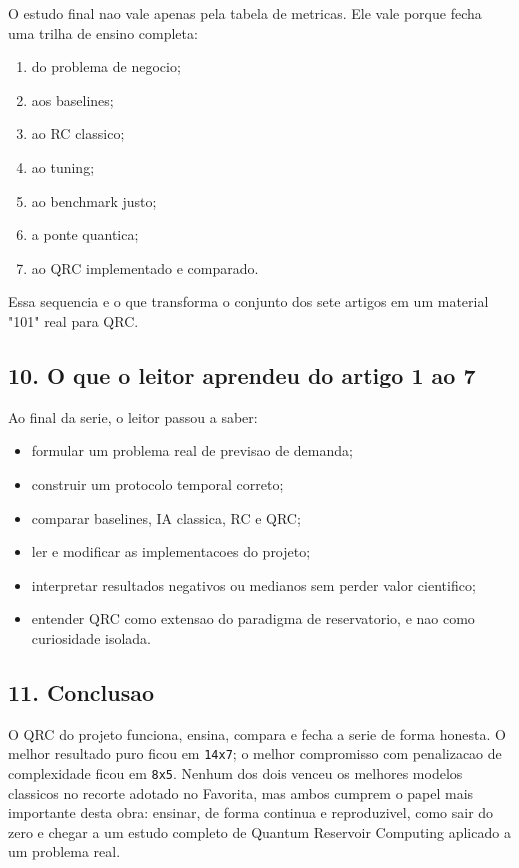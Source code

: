 \documentclass[12pt]{article}
\providecommand{\tightlist}{%
          \setlength{\itemsep}{0pt}\setlength{\parskip}{0pt}}
\begin{document}
O estudo final nao vale apenas pela tabela de metricas. Ele vale porque fecha uma trilha de ensino completa:

\begin{enumerate}
\def\labelenumi{\arabic{enumi}.}
\tightlist
\item
  do problema de negocio;
\item
  aos baselines;
\item
  ao RC classico;
\item
  ao tuning;
\item
  ao benchmark justo;
\item
  a ponte quantica;
\item
  ao QRC implementado e comparado.
\end{enumerate}

Essa sequencia e o que transforma o conjunto dos sete artigos em um material "101" real para QRC.

\subsection{10. O que o leitor aprendeu do artigo 1 ao 7}\label{10-o-que-o-leitor-aprendeu-do-artigo-1-ao-7}

Ao final da serie, o leitor passou a saber:

\begin{itemize}
\tightlist
\item
  formular um problema real de previsao de demanda;
\item
  construir um protocolo temporal correto;
\item
  comparar baselines, IA classica, RC e QRC;
\item
  ler e modificar as implementacoes do projeto;
\item
  interpretar resultados negativos ou medianos sem perder valor cientifico;
\item
  entender QRC como extensao do paradigma de reservatorio, e nao como curiosidade isolada.
\end{itemize}

\subsection{11. Conclusao}\label{11-conclusao}

O QRC do projeto funciona, ensina, compara e fecha a serie de forma honesta. O melhor resultado puro ficou em \texttt{14x7}; o melhor compromisso com penalizacao de complexidade ficou em \texttt{8x5}. Nenhum dos dois venceu os melhores modelos classicos no recorte adotado no Favorita, mas ambos cumprem o papel mais importante desta obra: ensinar, de forma continua e reproduzivel, como sair do zero e chegar a um estudo completo de Quantum Reservoir Computing aplicado a um problema real.
\end{document}
